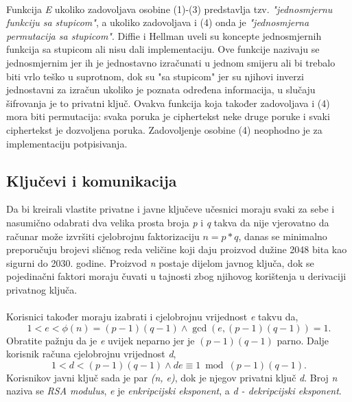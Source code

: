 \paragraph*{}
Funkcija \textit{E} ukoliko zadovoljava osobine (1)-(3) predstavlja tzv. \textit{"jednosmjernu funkciju sa stupicom"}, a ukoliko zadovoljava i (4) onda je \textit{"jednosmjerna permutacija sa stupicom"}. Diffie i Hellman\cite{diffie1976new} uveli su koncepte jednosmjernih funkcija sa stupicom ali nisu dali implementaciju. Ove funkcije nazivaju se jednosmjernim jer ih je jednostavno izračunati u jednom smijeru ali bi trebalo biti vrlo teško u suprotnom, dok su "sa stupicom" jer su njihovi inverzi jednostavni za izračun ukoliko je poznata određena informacija, u slučaju šifrovanja je to privatni ključ. Ovakva funkcija koja također zadovoljava i (4) mora biti permutacija: svaka poruka je ciphertekst neke druge poruke i svaki ciphertekst je dozvoljena poruka. Zadovoljenje osobine (4) neophodno je za implementaciju potpisivanja.

\subsection{Ključevi i komunikacija} \label{subs:keygen}
Da bi kreirali vlastite privatne i javne ključeve učesnici moraju svaki za sebe i nasumično odabrati dva velika prosta broja \textit{p} i \textit{q} takva da nije vjerovatno da računar može izvršiti cjelobrojnu faktorizaciju \(n = p * q\), danas se minimalno preporučuju brojevi sličnog reda veličine koji daju proizvod dužine 2048 bita kao sigurni do 2030. godine\cite{kaliski2003twirl}. Proizvod \textit{n} postaje dijelom javnog ključa, dok se pojedinačni faktori moraju čuvati u tajnosti zbog njihovog korištenja u derivaciji privatnog ključa.

\paragraph*{}
Korisnici također moraju izabrati i cjelobrojnu vrijednost \textit{e} takvu da, \[1 < e < \phi(n) = (p - 1)(q - 1) \wedge \gcd(e, (p - 1)(q - 1)) = 1.\] Obratite pažnju da je \textit{e} uvijek neparno jer je \((p - 1)(q - 1)\) parno. Dalje korisnik računa cjelobrojnu vrijednost \textit{d}, \[1 < d < (p - 1)(q - 1) \wedge de \equiv 1\bmod(p - 1)(q - 1).\] Korisnikov javni ključ sada je par \textit{(n, e)}, dok je njegov privatni ključ \textit{d}. Broj \textit{n} naziva se \textit{RSA modulus}, \textit{e} je \textit{enkripcijski eksponent}, a \textit{d - dekripcijski eksponent}\cite{buchmann2013introduction}.

